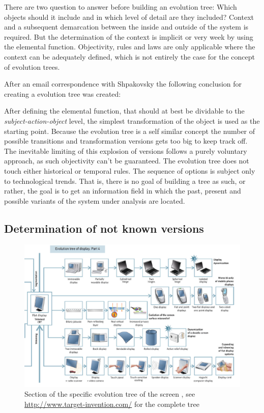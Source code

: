 \documentclass[11pt,a4paper]{article}
\begin{document}
There are two question to answer before building an evolution tree: Which
objects should it include and in which level of detail are they included?
Context and a subsequent demarcation between the inside and outside of the
system is required. But the determination of the context is implicit or very
week by using the elemental function. Objectivity, rules and laws are only
applicable where the context can be adequately defined, which is not entirely
the case for the concept of evolution trees.

After an email correspondence with Shpakovsky the following conclusion for
creating a evolution tree was created:

After defining the elemental function, that should at best be dividable to the
\textit{subject-action-object} level, the simplest transformation of the
object is used as the starting point. Because the evolution tree is a self
similar concept the number of possible transitions and transformation versions
gets too big to keep track off. The inevitable limiting of this explosion of
versions follows a purely voluntary approach, as such objectivity can't be
guaranteed. The evolution tree does not touch either historical or temporal
rules. The sequence of options is subject only to technological trends. That
is, there is no goal of building a tree as such, or rather, the goal is to get
an information field in which the past, present and possible variants of the
system under analysis are located.

\subsection{Determination of not known versions}

\begin{figure}[htb]
  \centering
  \includegraphics[width=.9\linewidth]{figures/removabledisplay.png}
  
  \caption{\small Section of the specific evolution tree of the screen
    \cite{Shpakovsky2016}, see \url{http://www.target-invention.com/} for
    the complete tree}
	\label{fig:spec_evo}
\end{figure}
\end{document}
